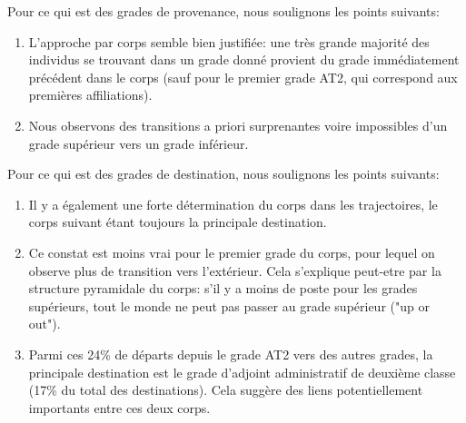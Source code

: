 \documentclass[11pt,a4paper]{article}
\begin{document}
\bigskip

Pour ce qui est des grades de provenance, nous soulignons les points suivants: 
\begin{enumerate}[leftmargin=1cm ,parsep=0cm,itemsep=0cm,topsep=0cm] 
\item L'approche par corps semble bien justifiée: une très grande majorité des individus se trouvant dans un grade donné provient du grade immédiatement précédent dans le corps (sauf pour le premier grade AT2, qui correspond aux premières affiliations).  
\item Nous observons des transitions a priori surprenantes voire impossibles d'un grade supérieur vers un grade inférieur.  
\end{enumerate}

\medskip

Pour ce qui est des grades de destination, nous soulignons les points suivants: 
\begin{enumerate}[leftmargin=1cm ,parsep=0cm,itemsep=0cm,topsep=0cm] 
\item Il y a également une forte détermination du corps dans les trajectoires, le corps suivant étant toujours la principale destination. 
\item Ce constat est moins vrai pour le premier grade du corps, pour lequel on observe plus de transition vers l'extérieur. Cela s'explique peut-etre par la structure pyramidale du corps: s'il y a moins de poste pour les grades supérieurs, tout le monde ne peut pas passer au grade supérieur ("up or out"). 
\item Parmi ces 24\% de départs depuis le grade AT2 vers des autres grades, la principale destination est le grade d'adjoint administratif de deuxième classe (17\% du total des destinations). Cela suggère des liens potentiellement importants entre ces deux corps.
\end{enumerate}


\medskip
\end{document}
